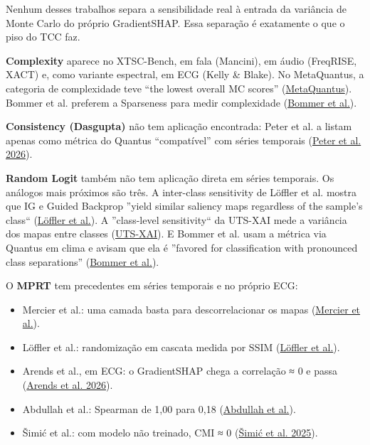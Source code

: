 \documentclass[11pt,a4paper]{article}
\begin{document}
Nenhum desses trabalhos separa a sensibilidade real à entrada da variância de Monte Carlo do próprio GradientSHAP. Essa separação é exatamente o que o piso do TCC faz.

\textbf{Complexity} aparece no XTSC-Bench, em fala (Mancini), em áudio (FreqRISE, XACT) e, como variante espectral, em ECG (Kelly \& Blake). No MetaQuantus, a categoria de complexidade teve ``the lowest overall MC scores'' (\href{https://arxiv.org/abs/2302.07265}{MetaQuantus}). Bommer et al. preferem a Sparseness para medir complexidade (\href{https://arxiv.org/abs/2303.00652}{Bommer et al.}).

\textbf{Consistency (Dasgupta)} não tem aplicação encontrada: Peter et al. a listam apenas como métrica do Quantus ``compatível'' com séries temporais (\href{https://arxiv.org/abs/2608.21449}{Peter et al. 2026}).

\textbf{Random Logit} também não tem aplicação direta em séries temporais. Os análogos mais próximos são três. A inter-class sensitivity de Löffler et al. mostra que IG e Guided Backprop ''yield similar saliency maps regardless of the sample's class`` (\href{https://arxiv.org/abs/2203.07861}{Löffler et al.}). A ''class-level sensitivity`` da UTS-XAI mede a variância dos mapas entre classes (\href{https://pmc.ncbi.nlm.nih.gov/articles/PMC13369486/}{UTS-XAI}). E Bommer et al. usam a métrica via Quantus em clima e avisam que ela é ''favored for classification with pronounced class separations'' (\href{https://arxiv.org/abs/2303.00652}{Bommer et al.}).

O \textbf{MPRT} tem precedentes em séries temporais e no próprio ECG:

\begin{itemize}
\item Mercier et al.: uma camada basta para descorrelacionar os mapas (\href{https://arxiv.org/abs/2202.03759}{Mercier et al.}).
\item Löffler et al.: randomização em cascata medida por SSIM (\href{https://arxiv.org/abs/2203.07861}{Löffler et al.}).
\item Arends et al., em ECG: o GradientSHAP chega a correlação ≈ 0 e passa (\href{https://pmc.ncbi.nlm.nih.gov/articles/PMC12980500/}{Arends et al. 2026}).
\item Abdullah et al.: Spearman de 1,00 para 0,18 (\href{https://pmc.ncbi.nlm.nih.gov/articles/PMC13296925/}{Abdullah et al.}).
\item Šimić et al.: com modelo não treinado, CMI ≈ 0 (\href{https://pmc.ncbi.nlm.nih.gov/articles/PMC12284047/}{Šimić et al. 2025}).
\end{itemize}
\end{document}
